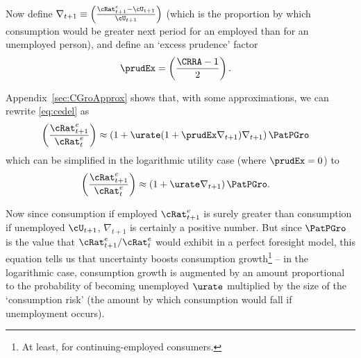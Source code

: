 \documentclass{handout}
\begin{document}


Now define $\nabla _{t+1} \equiv
\left(\frac{{\cRat}^{e}_{t+1}-\cU_{t+1}}{\cU_{t+1}}\right)$ (which is
the proportion by which consumption would
be greater next period for an employed than for an 
unemployed person), and define an `excess prudence' factor
\begin{equation}\begin{gathered}\begin{aligned}
  \prudEx & =  \left(\frac{\CRRA-1}{2}\right).
\end{aligned}\end{gathered}\end{equation}

Appendix~\ref{sec:CGroApprox} shows that, with some approximations, we can rewrite \eqref{eq:cedel} as
\begin{equation}\begin{gathered}\begin{aligned}
         \left(\frac{{\cRat}^{e}_{t+1}}{{\cRat}^{e}_{t}}\right) & \approx  \left(1+ \urate (1+\prudEx\nabla _{t+1})\nabla _{t+1}\right) {\PatPGro}
         \label{eq:cedelapprox}
\end{aligned}\end{gathered}\end{equation}
which can be simplified in the logarithmic utility case (where $\prudEx = 0$) to
\begin{equation}\begin{gathered}\begin{aligned}
         \left(\frac{{\cRat}^{e}_{t+1}}{{\cRat}^{e}_{t}}\right) & \approx  \left(1+ \urate \nabla _{t+1}\right) {\PatPGro} \label{eq:cedelapproxLog}. 
\end{aligned}\end{gathered}\end{equation}

Now since consumption if employed ${\cRat}^{e}_{t+1}$ is surely greater than
consumption if unemployed $\cU_{t+1}$, $\nabla _{t+1}$ is
certainly a positive number.  But since ${\PatPGro}$ is the
value that ${\cRat}^{e}_{t+1}/{\cRat}^{e}_{t}$ would exhibit in a perfect
foresight model, this equation tells us that uncertainty boosts
consumption growth\footnote{At least, for continuing-employed consumers.} -- in the logarithmic
case, consumption growth is augmented by an amount
proportional to the probability of becoming unemployed $\urate$ multiplied
by the size of the `consumption risk' (the amount by which consumption
would fall if unemployment occurs).
\end{document}
